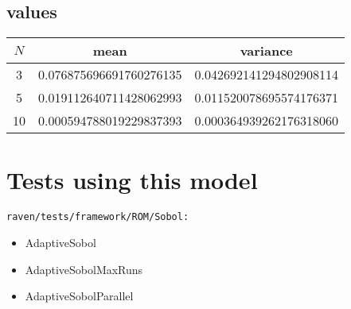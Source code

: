 \documentclass[11pt]{article}
\begin{document}
\subsection{values}
\begin{table}[H]
\centering
\begin{tabular}{c|c|c}
$N$ & mean & variance \\ \hline
3  & 0.076875696691760276135 & 0.042692141294802908114\\
5  & 0.019112640711428062993 & 0.011520078695574176371\\
10 & 0.000594788019229837393 & 0.000364939262176318060\\
\end{tabular}
\end{table}

\section{Tests using this model}
\texttt{raven/tests/framework/ROM/Sobol:}
\begin{itemize}
  \item AdaptiveSobol
  \item AdaptiveSobolMaxRuns
  \item AdaptiveSobolParallel
\end{itemize}
\end{document}
